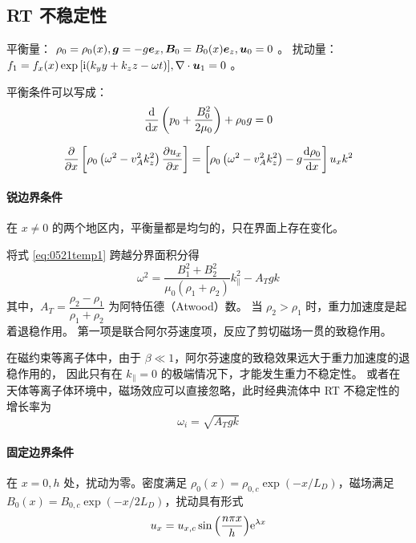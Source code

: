 \subsection{RT 不稳定性}

平衡量：
$\rho_0 = \rho_0(x),
\bm{g} = - g \bm{e}_x,
\bm{B}_0 = B_0(x) \bm{e}_z,
\bm{u}_0 = 0 $ 。
扰动量：
$f_1 = f_x(x) \exp{[\mathrm{i}(k_y y + k_z z - \omega t)]},
\nabla \cdot {\bm{u}_1} = 0 $ 。

平衡条件可以写成：
\begin{equation}
\frac{\mathop{}\!\mathrm{d} {}}{\mathop{}\!\mathrm{d} {x}} \left(p_0 + \frac{B_0^2}{2 \mu_0} \right) + \rho_0 g = 0
\end{equation}

\begin{equation} \label{eq:0521temp1}
\frac{\partial {}}{\partial {x}} \left[
    \rho_0 \left( \omega^2 - v_A^2 k_z^2 \right)
    \frac{\partial {u_x}}{\partial {x}}
\right]
= \left[
    \rho_0 \left( \omega^2 - v_A^2 k_z^2 \right)
    - g \frac{\mathop{}\!\mathrm{d} {\rho_0}}{\mathop{}\!\mathrm{d} {x}}
\right] u_x k^2
\end{equation}

\paragraph{锐边界条件}
在 $x \neq 0$ 的两个地区内，平衡量都是均匀的，只在界面上存在变化。

将式 \ref{eq:0521temp1} 跨越分界面积分得
\begin{equation}
\omega^2
= \frac{B_1^2 + B_2^2}{\mu_0 \left(\rho_1 + \rho_2\right)} k_\parallel^2
- A_T g k
\end{equation}
其中，$A_T = \dfrac{\rho_2 - \rho_1}{\rho_1 + \rho_2}$ 为阿特伍德（Atwood）数。
当 $\rho_2 > \rho_1$ 时，重力加速度是起着退稳作用。
第一项是联合阿尔芬速度项，反应了剪切磁场一贯的致稳作用。

在磁约束等离子体中，由于 $\beta \ll 1$，阿尔芬速度的致稳效果远大于重力加速度的退稳作用的，
因此只有在 $k_\parallel = 0$ 的极端情况下，才能发生重力不稳定性。
或者在天体等离子体环境中，磁场效应可以直接忽略，此时经典流体中 RT 不稳定性的增长率为
\begin{equation}
\omega_i = \sqrt{A_T g k}
\end{equation}

\paragraph{固定边界条件} 在 $x = 0, h$ 处，扰动为零。密度满足 $\rho_0(x) = \rho_{0,c} \exp{(- x / L_D)} $，磁场满足 $B_0(x) = B_{0,c} \exp{(- x / 2 L_D)}$，扰动具有形式
\begin{equation}
u_x = u_{x,c} \sin{\left(\frac{n \pi x}{h}\right)} \mathrm{e}^{\lambda x}
\end{equation}

